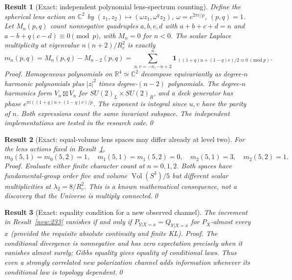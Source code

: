 \documentclass[aps,prd,onecolumn,notitlepage,groupedaddress,11pt]{revtex4-2}
\newtheorem{result}{Result}
\begin{document}
\begin{result}[\textsf{Exact}: independent polynomial lens-spectrum counting]\label{new:241}
Define the spherical lens action on $\mathbb C^2$ by $(z_1,z_2)\mapsto(\omega z_1,\omega^qz_2)$, $\omega=e^{2\pi i/p}$, $(p,q)=1$. Let $M_n(p,q)$ count nonnegative quadruples $a,b,c,d$ with $a+b+c+d=n$ and $a-b+q(c-d)\equiv0\pmod p$, with $M_n=0$ for $n<0$. The scalar Laplace multiplicity at eigenvalue $n(n+2)/R_c^2$ is exactly
\begin{equation}\label{eq:244-241}
m_n(p,q)=M_n(p,q)-M_{n-2}(p,q)
=\sum_{u,v=-n,-n+2}^{n}\mathbf1_{\,((1+q)u+(1-q)v)/2\equiv0\ (\mathrm{mod}\ p)}.
\end{equation}
\textit{Proof.} Homogeneous polynomials on $\mathbb R^4\simeq\mathbb C^2$ decompose equivariantly as degree-$n$ harmonic polynomials plus $|z|^2$ times degree-$(n-2)$ polynomials. The degree-$n$ harmonics form $V_n\boxtimes V_n$ for $SU(2)_L\times SU(2)_R$, and a deck generator has phase $e^{\pi i((1+q)u+(1-q)v)/p}$. The exponent is integral since $u,v$ have the parity of $n$. Both expressions count the same invariant subspace. The independent implementations are tested in the research code.\qed
\end{result}

\begin{result}[\textsf{Exact}: equal-volume lens spaces may differ already at level two]\label{new:242}
For the lens actions fixed in Result~\ref{new:241},
\begin{equation}\label{eq:244-242}
m_0(5,1)=m_0(5,2)=1,\quad m_1(5,1)=m_1(5,2)=0,\quad m_2(5,1)=3,\quad m_2(5,2)=1.
\end{equation}
\textit{Proof.} Evaluate either finite character count at $n=0,1,2$. Both spaces have fundamental-group order five and volume $\operatorname{Vol}(S^3)/5$ but different scalar multiplicities at $\lambda_2=8/R_c^2$. This is a known mathematical consequence, not a discovery that the Universe is multiply connected.\qed
\end{result}

\begin{result}[\textsf{Exact}: equality condition for a new observed channel]\label{new:243}
The increment in Result~\ref{new:233} vanishes if and only if $P_{Y|X=x}=Q_{Y|X=x}$ for $P_X$-almost every $x$ (provided the requisite absolute continuity and finite KL). \textit{Proof.} The conditional divergence is nonnegative and has zero expectation precisely when it vanishes almost surely; Gibbs equality gives equality of conditional laws. Thus even a strongly correlated new polarization channel adds information whenever its \emph{conditional} law is topology dependent.\qed
\end{result}
\end{document}
